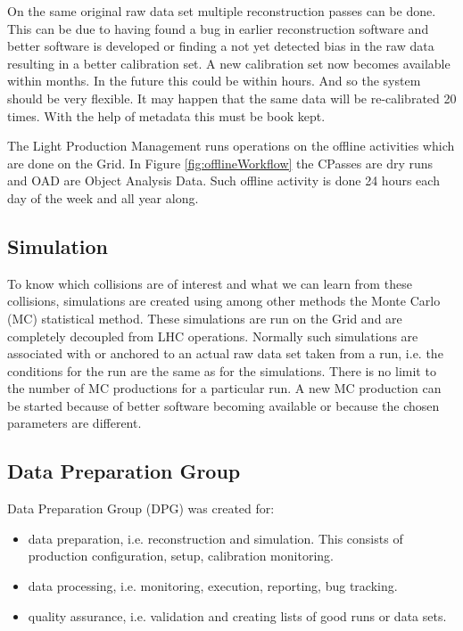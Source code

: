 On the same original raw data set multiple reconstruction passes can be done. This can be due to having found a bug in earlier reconstruction software and better software is developed or finding a not yet detected bias in the raw data resulting in a better calibration set. A new calibration set now becomes available within months. In the future this could be within hours. And so the system should be very flexible. It may happen that the same data will be re-calibrated 20 times. With the help of metadata this must be book kept.

The Light Production Management runs operations on the offline activities which are done on the Grid. In Figure \ref{fig:offlineWorkflow} the CPasses are dry runs and OAD are Object Analysis Data. Such offline activity is done 24 hours each day of the week and all year along.


\subsection{Simulation}
To know which collisions are of interest and what we can learn from these collisions, simulations are created using among other methods the Monte Carlo (MC) statistical method. These simulations are run on the Grid and are completely decoupled from LHC operations. Normally such simulations are associated with or anchored to an actual raw data set taken from a run, i.e. the conditions for the run are the same as for the simulations. There is no limit to the number of MC productions for a particular run. A new MC production can be started because of better software becoming available or because the chosen parameters are different.


\subsection{Data Preparation Group}
Data Preparation Group (DPG) was created for:
\begin{itemize}
  \item data preparation, i.e. reconstruction and simulation. This consists of production configuration, setup, calibration monitoring.
  \item data processing, i.e. monitoring, execution, reporting, bug tracking.
  \item quality assurance, i.e. validation and creating lists of good runs or data sets.
\end{itemize}




